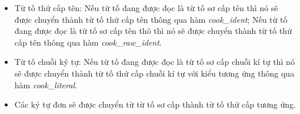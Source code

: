 \begin{itemize}
  
  \item Từ tố thứ cấp tên: Nếu từ tố đang được đọc là từ tố sơ cấp tên thì nó sẽ được chuyển thành từ tố thứ cấp tên thông qua hàm \textit{cook\_ident}; Nếu từ tố đang được đọc là từ tố sơ cấp tên thô thì nó sẽ được chuyển thành từ tố thứ cấp tên thông qua hàm \textit{cook\_raw\_ident}.
  
  
              
  
  \item Từ tố chuỗi ký tự: Nếu từ tố đang được đọc là từ tố sơ cấp chuỗi kí tự thì nó sẽ được chuyển thành từ tố thứ cấp chuỗi kí tự với kiểu tương ứng thông qua hàm \textit{cook\_literal}.
  
  
  
  
  \item Các ký tự đơn sẽ được chuyển từ từ tố sơ cấp thành từ tố thứ cấp tương ứng.
  

\end{itemize}
